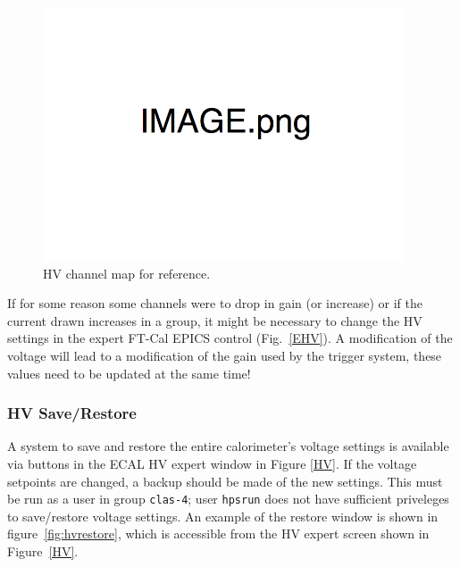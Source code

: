 \documentclass[12pt]{article}
\begin{document}
\begin{figure}[htbp]
\center
\includegraphics[width=0.95\textwidth]{Images/image.png}
\caption{ \label{ExpertMap} HV channel map for reference.}
\end{figure}

      If for some reason some channels were to drop in gain (or increase) or if the current drawn increases in a group, it might be necessary to change the HV settings in the expert FT-Cal EPICS control (Fig.~\ref{EHV}). A modification of the voltage will lead to a modification of the gain used by the trigger system, these values need to be updated at the same time!
    
      \subsubsection{HV Save/Restore}
      A system to save and restore the entire calorimeter's voltage settings is available via buttons in the ECAL HV expert window in Figure \ref{HV}.  If the voltage setpoints are changed, a backup should be made of the new settings.  This must be run as a user in group \texttt{clas-4};  user \texttt{hpsrun} does not have sufficient priveleges to save/restore voltage settings. 
      An example of the restore window is shown in figure~\ref{fig:hvrestore}, which is accessible from the HV expert screen shown in Figure~\ref{HV}.

\end{document}
